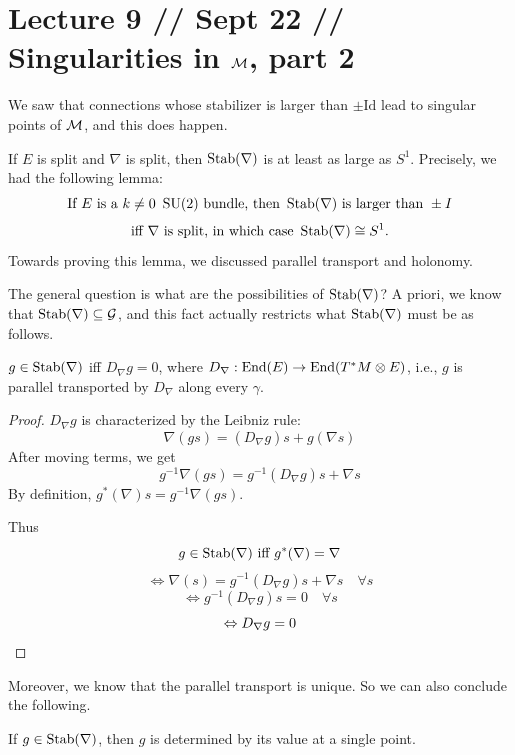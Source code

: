 \documentclass[main]{subfiles}
\begin{document}
\section*{Lecture 9 // Sept 22 // Singularities in $\mathcal{M}$, part 2}

\begin{recall}
We saw that connections whose stabilizer is larger than $\pm\mathrm{Id}$ lead to singular points of $\mathcal{M}$, and this does happen.

If $E$ is split and $\nabla$ is split, then $\operatorname{Stab}(\nabla)$ is at least as large as $S^1$. Precisely, we had the following lemma:
\[
\text{If } E \text{ is a } k\neq 0\ \operatorname{SU}(2) \text{ bundle, then } \operatorname{Stab}(\nabla) \text{ is larger than } \pm I
\]
\[
\text{iff } \nabla \text{ is split, in which case } \operatorname{Stab}(\nabla)\cong S^1.
\]
Towards proving this lemma, we discussed parallel transport and holonomy.
\end{recall}

The general question is what are the possibilities of $\operatorname{Stab}(\nabla)$? A priori, we know that $\operatorname{Stab}(\nabla)\subseteq \mathcal{G}$, and this fact actually restricts what $\operatorname{Stab}(\nabla)$ must be as follows.

\begin{lemma}
$g\in\operatorname{Stab}(\nabla)$ iff $D_\nabla g = 0$, where $D_\nabla : \operatorname{End}(E)\to \operatorname{End}(T^\ast M\otimes E)$, i.e., $g$ is parallel transported by $D_\nabla$ along every $\gamma$.
\end{lemma}

\begin{proof}
$D_\nabla g$ is characterized by the Leibniz rule:
\[
\nabla(gs) = (D_\nabla g)s + g(\nabla s)
\]
After moving terms, we get
\[
g^{-1}\nabla(gs) = g^{-1}(D_\nabla g)s + \nabla s
\]
By definition, $g^\ast(\nabla)s = g^{-1}\nabla(gs)$.

Thus
\[
g\in\operatorname{Stab}(\nabla) \text{ iff } g^\ast(\nabla)=\nabla
\]
\[
\Leftrightarrow \nabla(s) = g^{-1}(D_\nabla g)s + \nabla s \quad \forall s
\]
\[
\Leftrightarrow g^{-1}(D_\nabla g)s = 0 \quad \forall s
\]
\[
\Leftrightarrow D_\nabla g = 0 \qedhere
\]
\end{proof}

Moreover, we know that the parallel transport is unique. So we can also conclude the following.

\begin{lemma}
If $g\in\operatorname{Stab}(\nabla)$, then $g$ is determined by its value at a single point.
\end{lemma}
\end{document}
